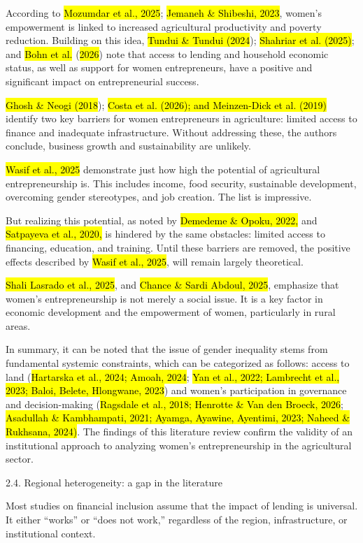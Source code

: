 According to \hl{Mozumdar et al., 2025}; \hl{Jemaneh \& Shibeshi, 2023},
women's empowerment is linked to increased agricultural productivity and
poverty reduction. Building on this idea, \hl{Tundui \& Tundui (2024});
\hl{Shahriar et al. (2025)}; and \hl{Bohn et al.} (\hl{2026}) note that
access to lending and household economic status, as well as support for
women entrepreneurs, have a positive and significant impact on
entrepreneurial success.

\hl{Ghosh \& Neogi (2018}); \hl{Costa et al. (2026); and Meinzen-Dick et
al. (2019)} identify two key barriers for women entrepreneurs in
agriculture: limited access to finance and inadequate infrastructure.
Without addressing these, the authors conclude, business growth and
sustainability are unlikely.

\hl{Wasif et al., 2025} demonstrate just how high the potential of
agricultural entrepreneurship is. This includes income, food security,
sustainable development, overcoming gender stereotypes, and job
creation. The list is impressive.

But realizing this potential, as noted by \hl{Demedeme \& Opoku, 2022,}
and \hl{Satpayeva et al., 2020,} is hindered by the same obstacles:
limited access to financing, education, and training. Until these
barriers are removed, the positive effects described by \hl{Wasif et
al., 2025}, will remain largely theoretical.

\hl{Shali Lasrado et al., 2025}, and \hl{Chance \& Sardi Abdoul, 2025},
emphasize that women's entrepreneurship is not merely a social issue. It
is a key factor in economic development and the empowerment of women,
particularly in rural areas.

In summary, it can be noted that the issue of gender inequality stems
from fundamental systemic constraints, which can be categorized as
follows: access to land (\hl{Hartarska et al., 2024; Amoah, 2024};
\hl{Yan et al., 2022; Lambrecht et al., 2023; Baloi, Belete, Hlongwane,
2023}) and women's participation in governance and decision-making
(\hl{Ragsdale et al., 2018; Henrotte \& Van den Broeck, 2026};
\hl{Asadullah \& Kambhampati, 2021; Ayamga, Ayawine, Ayentimi, 2023;
Naheed \& Rukhsana, 2024)}. The findings of this literature review
confirm the validity of an institutional approach to analyzing women's
entrepreneurship in the agricultural sector.

2.4. Regional heterogeneity: a gap in the literature

Most studies on financial inclusion assume that the impact of lending is
universal. It either ``works'' or ``does not work,'' regardless of the
region, infrastructure, or institutional context.

